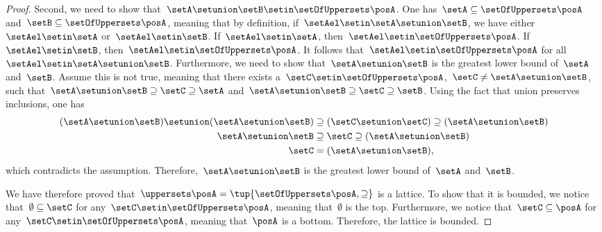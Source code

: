 \begin{proof}
        Second, we need to show that~$\setA\setunion \setB\setin \setOfUppersets \posA$.
        One has~$\setA\subseteq \setOfUppersets \posA$ and~$\setB \subseteq \setOfUppersets \posA$, meaning that by definition, if~$\setAel\setin \setA\setunion \setB$, we have either~$\setAel\setin \setA$ or~$\setAel\setin \setB$.
        If~$\setAel\setin \setA$, then~$\setAel\setin \setOfUppersets \posA$.
        If~$\setAel\setin \setB$, then~$\setAel \setin \setOfUppersets \posA$.
        It follows that~$\setAel \setin \setOfUppersets \posA$ for all~$\setAel\setin \setA\setunion \setB$.
        Furthermore, we need to show that~$\setA\setunion \setB$ is the greatest lower bound of~$\setA$ and~$\setB$.
        Assume this is not true, meaning that there exists a~$\setC\setin \setOfUppersets \posA$,~$\setC\neq \setA\setunion \setB$, such that~$\setA\setunion \setB\supseteq \setC\supseteq \setA$ and~$\setA\setunion \setB\supseteq \setC\supseteq \setB$.
        Using the fact that union preserves inclusions, one has
        \begin{equation}
            \begin{aligned}
                (\setA\setunion \setB)
                \setunion (\setA\setunion \setB) & \supseteq (\setC \setunion \setC) \supseteq (\setA\setunion \setB) \\
                \setA\setunion \setB             & \supseteq \setC\supseteq (\setA\setunion \setB ) \\
                \setC                            & =(\setA\setunion \setB),
            \end{aligned}
        \end{equation}
        which contradicts the assumption.
        Therefore,~$\setA\setunion \setB$ is the greatest lower bound of~$\setA$ and~$\setB$.

        We have therefore proved that~$\uppersets \posA=\tup{\setOfUppersets \posA,\supseteq}$ is a lattice.
        To show that it is bounded, we notice that~$\emptyset \subseteq \setC$ for any~$\setC\setin \setOfUppersets \posA$, meaning that~$\emptyset$ is the top.
        Furthermore, we notice that~$\setC\subseteq \posA$ for any~$\setC\setin \setOfUppersets \posA$, meaning that~$\posA$ is a bottom.
    Therefore, the lattice is bounded.
\end{proof}

